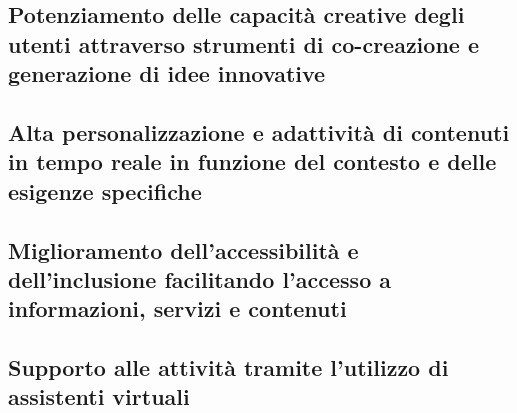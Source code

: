     \subsection{Potenziamento delle capacità creative degli utenti attraverso strumenti di co-creazione e generazione di idee innovative}
    
    \subsection{Alta personalizzazione e adattività di contenuti in tempo reale in funzione del contesto e delle esigenze specifiche}
    
    \subsection{Miglioramento dell'accessibilità e dell'inclusione facilitando l'accesso a informazioni, servizi e contenuti}
    
    \subsection{Supporto alle attività tramite l'utilizzo di assistenti virtuali}
    
    